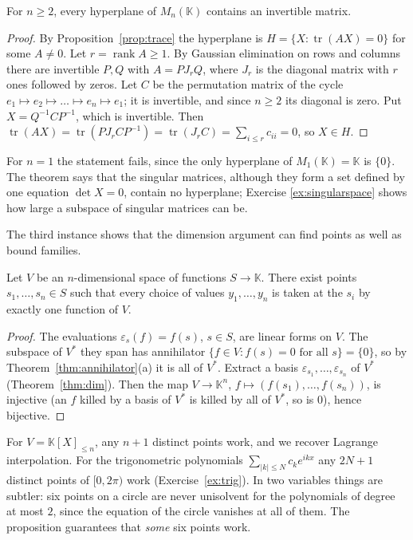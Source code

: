 \begin{theorem}\label{thm:hyperplane}
For $n\ge2$, every hyperplane of $M_n(\mathbb K)$ contains an invertible matrix.
\end{theorem}
\begin{proof}
By Proposition~\ref{prop:trace} the hyperplane is $H=\{X:\operatorname{tr}(AX)=0\}$ for some $A\ne0$. Let $r=\operatorname{rank}A\ge1$.
By Gaussian elimination on rows and columns there are invertible $P,Q$ with $A=PJ_rQ$, where $J_r$ is the diagonal matrix
with $r$ ones followed by zeros. Let $C$ be the permutation matrix of the cycle $e_1\mapsto e_2\mapsto\dots\mapsto e_n\mapsto
e_1$; it is invertible, and since $n\ge2$ its diagonal is zero. Put $X=Q^{-1}CP^{-1}$, which is invertible. Then
$\operatorname{tr}(AX)=\operatorname{tr}(PJ_rCP^{-1})=\operatorname{tr}(J_rC)=\sum_{i\le r}c_{ii}=0$, so $X\in H$.
\end{proof}

For $n=1$ the statement fails, since the only hyperplane of $M_1(\mathbb K)=\mathbb K$ is $\{0\}$. The theorem says that
the singular matrices, although they form a set defined by one equation $\det X=0$, contain no hyperplane; Exercise
\ref{ex:singularspace} shows how large a subspace of singular matrices can be.

The third instance shows that the dimension argument can find points as well as bound families.

\begin{proposition}\label{prop:unisolvent}
Let $V$ be an $n$-dimensional space of functions $S\to\mathbb K$. There exist points $s_1,\dots,s_n\in S$ such that every
choice of values $y_1,\dots,y_n$ is taken at the $s_i$ by exactly one function of $V$.
\end{proposition}
\begin{proof}
The evaluations $\varepsilon_s(f)=f(s)$, $s\in S$, are linear forms on $V$. The subspace of $V^*$ they span has annihilator
$\{f\in V:f(s)=0\text{ for all }s\}=\{0\}$, so by Theorem~\ref{thm:annihilator}(a) it is all of $V^*$. Extract a basis
$\varepsilon_{s_1},\dots,\varepsilon_{s_n}$ of $V^*$ (Theorem~\ref{thm:dim}). Then the map $V\to\mathbb K^n$,
$f\mapsto(f(s_1),\dots,f(s_n))$, is injective (an $f$ killed by a basis of $V^*$ is killed by all of $V^*$, so is $0$),
hence bijective.
\end{proof}

For $V=\mathbb K[X]_{\le n}$, any $n+1$ distinct points work, and we recover Lagrange interpolation. For the trigonometric
polynomials $\sum_{|k|\le N}c_ke^{ikx}$ any $2N+1$ distinct points of $[0,2\pi)$ work (Exercise~\ref{ex:trig}). In two
variables things are subtler: six points on a circle are never unisolvent for the polynomials of degree at most $2$,
since the equation of the circle vanishes at all of them. The proposition guarantees that \emph{some} six points work.

